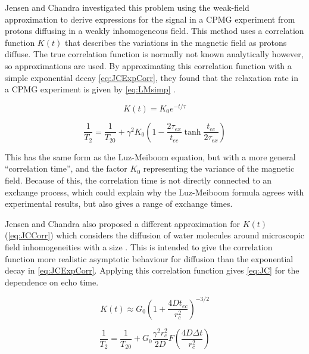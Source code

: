 Jensen and Chandra investigated this problem using the weak-field approximation to derive expressions for the signal in a CPMG experiment from protons diffusing in a weakly inhomogeneous field\cite{JensenNMRrelaxationtissues2000}.
This method uses a correlation function $K(t)$ that describes the variations in the magnetic field as protons diffuse.
The true correlation function is normally not known analytically however, so approximations are used.
By approximating this correlation function with a simple exponential decay \autoref{eq:JCExpCorr}, they found that the relaxation rate in a CPMG experiment is given by \autoref{eq:LMsimp} \cite{JensenNMRrelaxationtissues2000}.

\begin{equation}
K(t) = K_0 e^{-t/\tau}
\label{eq:JCExpCorr}
\end{equation}

\begin{equation}
\label{eq:LMsimp}
\frac{1}{T_2} = \frac{1}{T_{20}} + \gamma^2 K_0 (1 - \frac{2\tau_{ex}}{t_{ec}} \tanh{\frac{t_{ec}}{2\tau_{ex}}})
\end{equation}

This has the same form as the Luz-Meiboom equation, but with a more general ``correlation time'', and the factor $K_0$ representing the variance of the magnetic field.
Because of this, the correlation time is not directly connected to an exchange process, which could explain why the Luz-Meiboom formula agrees with experimental results, but also gives a range of exchange times.

Jensen and Chandra also proposed a different approximation for $K(t)$ (\autoref{eq:JCCorr}) which considers the diffusion of water molecules around microscopic field inhomogeneities with a size \rc.
This is intended to give the correlation function more realistic asymptotic behaviour for diffusion than the exponential decay in \autoref{eq:JCExpCorr}.
Applying this correlation function gives \autoref{eq:JC} for the \Ttwo dependence on echo time.

\begin{equation}
K(t) \approx G_0 \left(1 + \frac{4Dt_{ec}}{r_c^2}\right)^{-3/2}
\label{eq:JCCorr}
\end{equation}

\begin{equation}
\label{eq:JC}
\frac{1}{T_2} = \frac{1}{T_{20}}+ G_0 \frac{\gamma^2 r_c^2}{2D} F(\frac{4D \Delta t}{r_c^2})
\end{equation}

